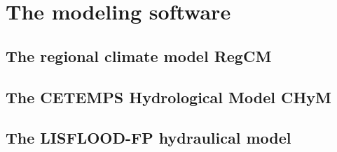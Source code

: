 \chapter{The modeling software}

\section{The regional climate model RegCM}

\section{The CETEMPS Hydrological Model CHyM}

\section{The LISFLOOD-FP hydraulical model}